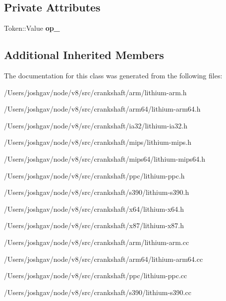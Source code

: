 \subsection*{Private Attributes}
\begin{DoxyCompactItemize}
\item 
Token\+::\+Value {\bfseries op\+\_\+}\hypertarget{classv8_1_1internal_1_1_l_arithmetic_t_ab64a6662e458a6d47ecc0ca8acee20a9}{}\label{classv8_1_1internal_1_1_l_arithmetic_t_ab64a6662e458a6d47ecc0ca8acee20a9}

\end{DoxyCompactItemize}
\subsection*{Additional Inherited Members}


The documentation for this class was generated from the following files\+:\begin{DoxyCompactItemize}
\item 
/\+Users/joshgav/node/v8/src/crankshaft/arm/lithium-\/arm.\+h\item 
/\+Users/joshgav/node/v8/src/crankshaft/arm64/lithium-\/arm64.\+h\item 
/\+Users/joshgav/node/v8/src/crankshaft/ia32/lithium-\/ia32.\+h\item 
/\+Users/joshgav/node/v8/src/crankshaft/mips/lithium-\/mips.\+h\item 
/\+Users/joshgav/node/v8/src/crankshaft/mips64/lithium-\/mips64.\+h\item 
/\+Users/joshgav/node/v8/src/crankshaft/ppc/lithium-\/ppc.\+h\item 
/\+Users/joshgav/node/v8/src/crankshaft/s390/lithium-\/s390.\+h\item 
/\+Users/joshgav/node/v8/src/crankshaft/x64/lithium-\/x64.\+h\item 
/\+Users/joshgav/node/v8/src/crankshaft/x87/lithium-\/x87.\+h\item 
/\+Users/joshgav/node/v8/src/crankshaft/arm/lithium-\/arm.\+cc\item 
/\+Users/joshgav/node/v8/src/crankshaft/arm64/lithium-\/arm64.\+cc\item 
/\+Users/joshgav/node/v8/src/crankshaft/ppc/lithium-\/ppc.\+cc\item 
/\+Users/joshgav/node/v8/src/crankshaft/s390/lithium-\/s390.\+cc\end{DoxyCompactItemize}
